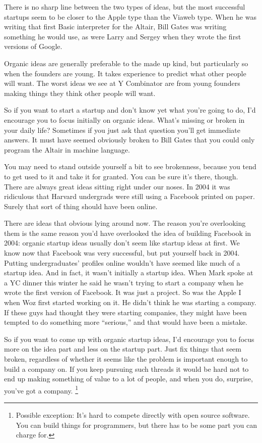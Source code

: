 \documentclass[12pt]{book}
\begin{document}
There is no sharp line between the two types of ideas, but the most
successful startups seem to be closer to the Apple type than the Viaweb
type. When he was writing that first Basic interpreter for the Altair,
Bill Gates was writing something he would use, as were Larry and Sergey
when they wrote the first versions of Google.

Organic ideas are generally preferable to the made up kind, but
particularly so when the founders are young. It takes experience to
predict what other people will want. The worst ideas we see at Y
Combinator are from young founders making things they think other people
will want.

So if you want to start a startup and don't know yet what you're going
to do, I'd encourage you to focus initially on organic ideas. What's
missing or broken in your daily life? Sometimes if you just ask that
question you'll get immediate answers. It must have seemed obviously
broken to Bill Gates that you could only program the Altair in machine
language.

You may need to stand outside yourself a bit to see brokenness, because
you tend to get used to it and take it for granted. You can be sure it's
there, though. There are always great ideas sitting right under our
noses. In 2004 it was ridiculous that Harvard undergrads were still
using a Facebook printed on paper. Surely that sort of thing should have
been online.

There are ideas that obvious lying around now. The reason you're
overlooking them is the same reason you'd have overlooked the idea of
building Facebook in 2004: organic startup ideas usually don't seem like
startup ideas at first. We know now that Facebook was very successful,
but put yourself back in 2004. Putting undergraduates' profiles online
wouldn't have seemed like much of a startup idea. And in fact, it wasn't
initially a startup idea. When Mark spoke at a YC dinner this winter he
said he wasn't trying to start a company when he wrote the first version
of Facebook. It was just a project. So was the Apple I when Woz first
started working on it. He didn't think he was starting a company. If
these guys had thought they were starting companies, they might have
been tempted to do something more ``serious,'' and that would have been
a mistake.

So if you want to come up with organic startup ideas, I'd encourage you
to focus more on the idea part and less on the startup part. Just fix
things that seem broken, regardless of whether it seems like the problem
is important enough to build a company on. If you keep pursuing such
threads it would be hard not to end up making something of value to a
lot of people, and when you do, surprise, you've got a company.
\footnote{Possible exception: It's hard to compete directly with open
source software. You can build things for programmers, but there has to
be some part you can charge for.}
\end{document}
